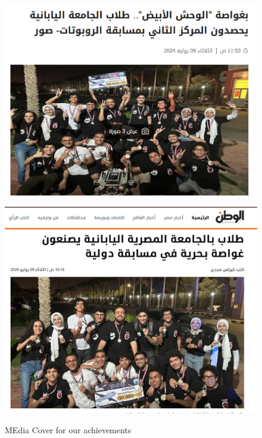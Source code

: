 \documentclass[a4paper,12pt]{article}
\begin{document}
\begin{figure}[h]
    \centering
    \begin{minipage}{0.46\textwidth}
        \centering
        \includegraphics[width=\textwidth]{Masrawy.png}
        
        \label{fig:figure1}
    \end{minipage}
    \hfill
    \begin{minipage}{0.44\textwidth}
        \centering
        \includegraphics[width=\textwidth]{Elwatan news.png}
      
        \label{fig:figure2}
    \end{minipage}
    \caption{MEdia Cover for our achievements }
    \label{fig:both_figures}
\end{figure}
\end{document}
